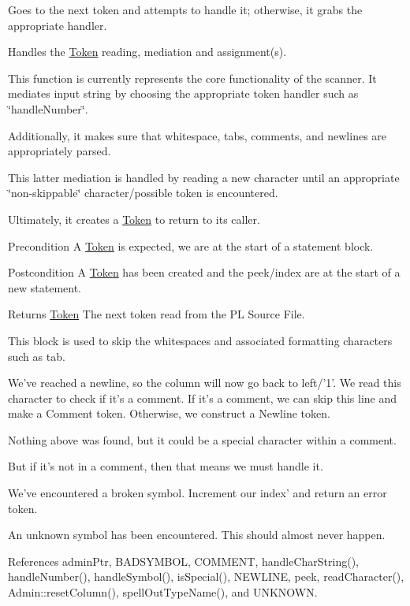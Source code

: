 Goes to the next token and attempts to handle it; otherwise, it grabs the appropriate handler. 

Handles the \hyperlink{classToken}{Token} reading, mediation and assignment(s).

This function is currently represents the core functionality of the scanner. It mediates input string by choosing the appropriate token handler such as \char`\"{}handleNumber\char`\"{}.

Additionally, it makes sure that whitespace, tabs, comments, and newlines are appropriately parsed.

This latter mediation is handled by reading a new character until an appropriate \char`\"{}non-\/skippable\char`\"{} character/possible token is encountered.

Ultimately, it creates a \hyperlink{classToken}{Token} to return to its caller.

\begin{DoxyPrecond}{Precondition}
A \hyperlink{classToken}{Token} is expected, we are at the start of a statement block. 
\end{DoxyPrecond}
\begin{DoxyPostcond}{Postcondition}
A \hyperlink{classToken}{Token} has been created and the peek/index are at the start of a new statement. 
\end{DoxyPostcond}
\begin{DoxyReturn}{Returns}
\hyperlink{classToken}{Token} The next token read from the PL Source File. 
\end{DoxyReturn}


This block is used to skip the whitespaces and associated formatting characters such as tab.

We've reached a newline, so the column will now go back to left/'1'. We read this character to check if it's a comment. If it's a comment, we can skip this line and make a Comment token. Otherwise, we construct a Newline token.

Nothing above was found, but it could be a special character within a comment.

But if it's not in a comment, then that means we must handle it.

We've encountered a broken symbol. Increment our index' and return an error token.

An unknown symbol has been encountered. This should almost never happen. 



References adminPtr, BADSYMBOL, COMMENT, handleCharString(), handleNumber(), handleSymbol(), isSpecial(), NEWLINE, peek, readCharacter(), Admin::resetColumn(), spellOutTypeName(), and UNKNOWN.

